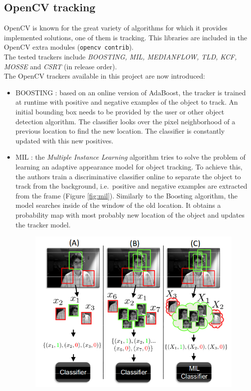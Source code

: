 \subsection{OpenCV tracking}
OpenCV is known for the great variety of algorithms for which it provides implemented solutions, one of them is tracking. This libraries are included in the OpenCV extra modules (\texttt{opencv contrib}).\\
The tested trackers include \textit{BOOSTING, MIL, MEDIANFLOW, TLD, KCF, MOSSE} and \textit{CSRT} (in release order).
\\
The OpenCV trackers available in this project are now introduced:
\begin{itemize}
\item BOOSTING \cite{grabner2006real}: based on an online version of AdaBoost, the tracker is trained at runtime with positive and negative examples of the object to track. An initial bounding box needs to be provided by the user or other object detection algorithm. The classifier looks over the pixel neighborhood of a previous location to find the new location. The classifier is constantly updated with this new positives.
\item MIL \cite{babenko2009visual}: the \textit{Multiple Instance Learning} algorithm tries to solve the problem of learning an adaptive appearance model for object tracking. To achieve this, the authors train a discriminative classifier online to separate the object to track from the background, i.e.\ positive and negative examples are extracted from the frame (Figure \ref{fig:mil}). Similarly to the Boosting algorithm, the model searches inside of the window of the old location. It obtains a probability map with most probably new location of the object and updates the tracker model.
\begin{figure}[H]
\begin{center}
\includegraphics[scale=0.4]{figures/mil.png}

\end{center}
\end{figure}
\end{itemize}
